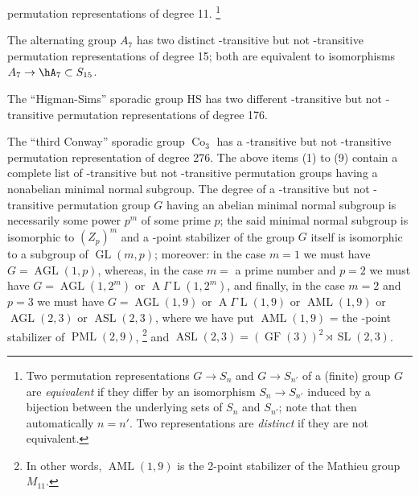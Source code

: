 permutation representations of degree {\rm11}.
\footnote{Two permutation representations $G\to S_n$ and 
$G\to S_{n'}$
of a (finite) group $G$ are {\it equivalent} if they 
differ by an isomorphism
$S_n\to S_{n'}$ induced by a bijection between the 
underlying sets of $S_n$
and $S_{n'}$; note that then automatically $n=n'$. Two 
representations are
{\it distinct} if they are not equivalent.}
\item
The alternating group $A_7$ has two distinct 
-transitive but not 
-transitive permutation representations of degree 
{\rm15;} 
both are equivalent to isomorphisms $A_7\to\hA_7\subset 
S_{15}$.
\item
The ``Higman-Sims'' sporadic group {\rm HS} has two 
different  
-transitive but 
not -transitive permutation representations of degree 
{\rm176}.
\item
The ``third Conway'' sporadic group $\operatorname{Co}_3$ 
has a 
-transitive but not
-transitive permutation representation of degree 
{\rm276}.
\endroster
The above items {\rm(1)} to {\rm(9)} contain a complete 
list of -transitive
but not -transitive permutation groups having a 
nonabelian 
minimal normal subgroup. The degree of a -transitive 
but not -transitive
permutation group $G$ having an abelian minimal normal 
subgroup is necessarily
some power $p^m$ of some prime $p$\RM; the said minimal 
normal subgroup is
isomorphic to $(Z_p)^m$ and a -point stabilizer of the 
group $G$ itself is
isomorphic to a subgroup of $\operatorname{GL}(m,p)$\RM;
moreover\RM: in the case $m=1$ we must have 
$G=\operatorname{AGL}(1,p)$, whereas, in 
the case
$m=$ a prime number and $p=2$  we must have 
$G=\operatorname{AGL}(1,2^m)$ or 
$\operatorname{A}\Gamma\operatorname{L}(1,2^m)$,
and finally, in the case $m=2$ and $p=3$ we must have 
$G=\operatorname{AGL}(1,9)$ or
$\operatorname{A}\Gamma\operatorname{L}(1,9)$ or 
$\operatorname{AML}(1,9)$
or $\operatorname{AGL}(2,3)$ or $\operatorname{ASL}(2,3)$, 
where we have put $\operatorname{AML}(1,9)$ = the -point
stabilizer of $\operatorname{PML}(2,9)$,
\footnote{In other words, $\operatorname{AML}(1,9)$ is the 
2-point stabilizer of the
Mathieu group $M_{11}$.}
and 
$\operatorname{ASL}(2,3)=(\operatorname{GF}(3))^2\rtimes 
\operatorname{SL}(2,3)$.
\endproclaim 
 
